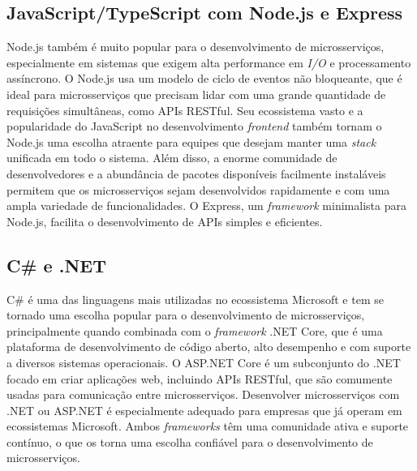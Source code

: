 \subsection{JavaScript/TypeScript com Node.js e Express}

Node.js também é muito popular para o desenvolvimento de microsserviços, especialmente em sistemas que exigem alta performance em \emph{I/O} e processamento assíncrono. O Node.js usa um modelo de ciclo de eventos não bloqueante, que é ideal para microsserviços que precisam lidar com uma grande quantidade de requisições simultâneas, como APIs RESTful. Seu ecossistema vasto e a popularidade do JavaScript no desenvolvimento \emph{frontend} também tornam o Node.js uma escolha atraente para equipes que desejam manter uma \emph{stack} unificada em todo o sistema. Além disso, a enorme comunidade de desenvolvedores e a abundância de pacotes disponíveis facilmente instaláveis permitem que os microsserviços sejam desenvolvidos rapidamente e com uma ampla variedade de funcionalidades. O Express, um \emph{framework} minimalista para Node.js, facilita o desenvolvimento de APIs simples e eficientes. 
\cite{expressjs,nodejs}

\subsection{C\# e .NET}

C\# é uma das linguagens mais utilizadas no ecossistema Microsoft e tem se tornado uma escolha popular para o desenvolvimento de microsserviços, principalmente quando combinada com o \emph{framework} .NET Core, que é uma plataforma de desenvolvimento de código aberto, alto desempenho e com suporte a diversos sistemas operacionais. O ASP.NET Core é um subconjunto do .NET focado em criar aplicações web, incluindo APIs RESTful, que são comumente usadas para comunicação entre microsserviços. Desenvolver microsserviços com .NET ou ASP.NET é especialmente adequado para empresas que já operam em ecossistemas Microsoft. Ambos \emph{frameworks} têm uma comunidade ativa e suporte contínuo, o que os torna uma escolha confiável para o desenvolvimento de microsserviços. 
\cite{dotnetcore,aspnetcore}



